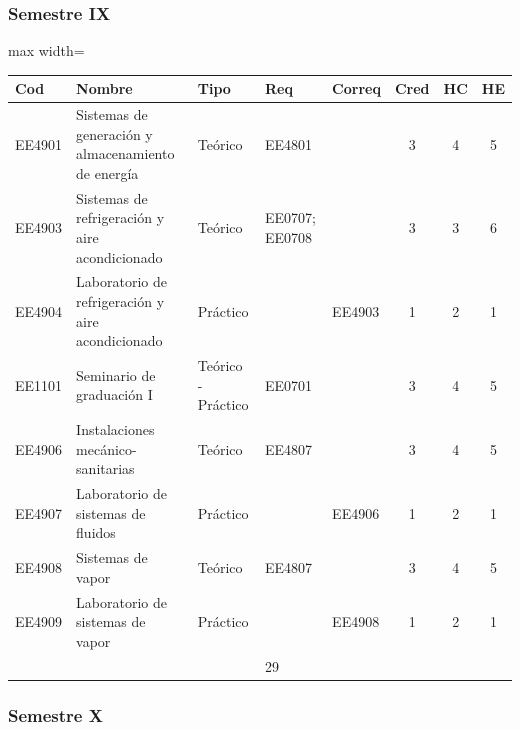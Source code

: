 \subsubsection*{Semestre IX}

\begin{center}
\small
\begin{adjustbox}{max width=\textwidth}
\begin{tabular}{|>{\RaggedRight\arraybackslash}p{1.25cm}|>{\RaggedRight\arraybackslash}p{5.2cm}|>{\RaggedRight\arraybackslash}p{1.65cm}|p{1.25cm}|p{1.25cm}|c|c|c|}
\hline
\rowcolor{grisEncabezado}
Cod & Nombre & Tipo & Req & Correq & Cred & HC & HE \\ \hline
EE4901 & Sistemas de generación y almacenamiento de energía & Teórico & EE4801 &  & 3 & 4 & 5 \\ \hline
\rowcolor{azulTabla}
EE4903 & Sistemas de refrigeración y aire acondicionado & Teórico & EE0707; EE0708 &  & 3 & 3 & 6 \\ \hline
EE4904 & Laboratorio de refrigeración y aire acondicionado & Práctico &  & EE4903 & 1 & 2 & 1 \\ \hline
\rowcolor{azulTabla}
EE1101 & Seminario de graduación I & Teórico - Práctico & EE0701 &  & 3 & 4 & 5 \\ \hline
EE4906 & Instalaciones mecánico-sanitarias & Teórico & EE4807 &  & 3 & 4 & 5 \\ \hline
\rowcolor{azulTabla}
EE4907 & Laboratorio de sistemas de fluidos & Práctico &  & EE4906 & 1 & 2 & 1 \\ \hline
EE4908 & Sistemas de vapor & Teórico & EE4807 &  & 3 & 4 & 5 \\ \hline
\rowcolor{azulTabla}
EE4909 & Laboratorio de sistemas de vapor & Práctico &  & EE4908 & 1 & 2 & 1 \\ \hline
\multicolumn{5}{|l|}{Total} & 18 & 25 & 29 \\ \hline
\end{tabular}
\end{adjustbox}
\end{center}

\subsubsection*{Semestre X}

